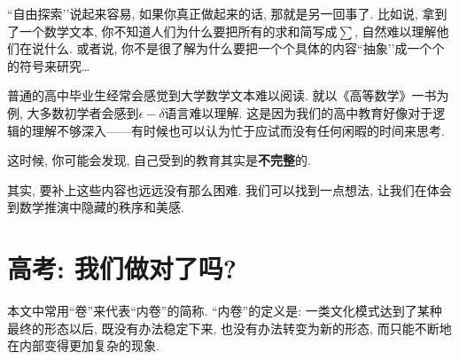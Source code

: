     ``自由探索’’说起来容易, 如果你真正做起来的话, 那就是另一回事了. 比如说, 拿到了一个数学文本, 你不知道人们为什么要把所有的求和简写成$\sum$, 自然难以理解他们在说什么. 或者说, 你不是很了解为什么要把一个个具体的内容``抽象’’成一个个的符号来研究…

    普通的高中毕业生经常会感觉到大学数学文本难以阅读. 就以《高等数学》一书为例, 大多数初学者会感到$\epsilon-\delta$语言难以理解. 这是因为我们的高中教育好像对于逻辑的理解不够深入——有时候也可以认为忙于应试而没有任何闲暇的时间来思考. 

    这时候, 你可能会发现, 自己受到的教育其实是\textbf{不完整}的. 

    其实, 要补上这些内容也远远没有那么困难. 我们可以找到一点想法, 让我们在体会到数学推演中隐藏的秩序和美感. 

    \section{高考: 我们做对了吗?}
    \begin{definition}
        本文中常用``卷''来代表``内卷''的简称. ``内卷''的定义是: 一类文化模式达到了某种最终的形态以后, 既没有办法稳定下来, 也没有办法转变为新的形态, 而只能不断地在内部变得更加复杂的现象. 
    \end{definition}

